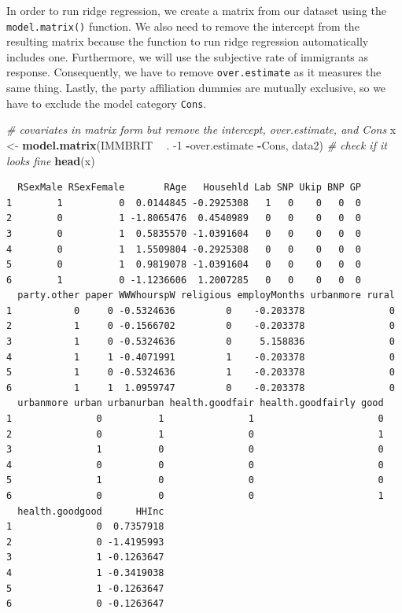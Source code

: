 \documentclass[]{article}
\newenvironment{Shaded}{\begin{snugshade}}{\end{snugshade}}
\newcommand{\CommentTok}[1]{\textcolor[rgb]{0.56,0.35,0.01}{\textit{#1}}}
\newcommand{\DecValTok}[1]{\textcolor[rgb]{0.00,0.00,0.81}{#1}}
\newcommand{\KeywordTok}[1]{\textcolor[rgb]{0.13,0.29,0.53}{\textbf{#1}}}
\newcommand{\NormalTok}[1]{#1}
\newcommand{\OperatorTok}[1]{\textcolor[rgb]{0.81,0.36,0.00}{\textbf{#1}}}
\newcommand{\StringTok}[1]{\textcolor[rgb]{0.31,0.60,0.02}{#1}}
\begin{document}
In order to run ridge regression, we create a matrix from our dataset using the \texttt{model.matrix()} function. We also need to remove the intercept from the resulting matrix because the function to run ridge regression automatically includes one. Furthermore, we will use the subjective rate of immigrants as response. Consequently, we have to remove \texttt{over.estimate} as it measures the same thing. Lastly, the party affiliation dummies are mutually exclusive, so we have to exclude the model category \texttt{Cons}.

\begin{Shaded}
\begin{Highlighting}[]
\CommentTok{# covariates in matrix form but remove the intercept, over.estimate, and Cons}
\NormalTok{x <-}\StringTok{ }\KeywordTok{model.matrix}\NormalTok{(IMMBRIT }\OperatorTok{~}\StringTok{ }\NormalTok{. }\DecValTok{-1} \OperatorTok{-}\NormalTok{over.estimate }\OperatorTok{-}\NormalTok{Cons, data2)}
\CommentTok{# check if it looks fine}
\KeywordTok{head}\NormalTok{(x)}
\end{Highlighting}
\end{Shaded}

\begin{verbatim}
  RSexMale RSexFemale       RAge   Househld Lab SNP Ukip BNP GP
1        1          0  0.0144845 -0.2925308   1   0    0   0  0
2        0          1 -1.8065476  0.4540989   0   0    0   0  0
3        0          1  0.5835570 -1.0391604   0   0    0   0  0
4        0          1  1.5509804 -0.2925308   0   0    0   0  0
5        0          1  0.9819078 -1.0391604   0   0    0   0  0
6        1          0 -1.1236606  1.2007285   0   0    0   0  0
  party.other paper WWWhourspW religious employMonths urbanmore rural
1           0     0 -0.5324636         0    -0.203378               0
2           1     0 -0.1566702         0    -0.203378               0
3           1     0 -0.5324636         0     5.158836               0
4           1     1 -0.4071991         1    -0.203378               0
5           1     0 -0.5324636         1    -0.203378               0
6           1     1  1.0959747         0    -0.203378               0
  urbanmore urban urbanurban health.goodfair health.goodfairly good
1               0          1               1                      0
2               0          1               0                      1
3               1          0               0                      0
4               0          0               0                      0
5               1          0               0                      0
6               0          0               0                      1
  health.goodgood      HHInc
1               0  0.7357918
2               0 -1.4195993
3               1 -0.1263647
4               1 -0.3419038
5               1 -0.1263647
6               0 -0.1263647
\end{verbatim}
\end{document}
